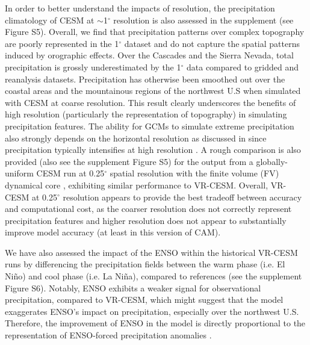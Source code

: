 \documentclass{ametsoc}
\begin{document}

 In order to better understand the impacts of resolution, the precipitation climatology of CESM at $\sim$1$^\circ$ resolution is also assessed in the supplement (see Figure S5). Overall, we find that precipitation patterns over complex topography are poorly represented in the 1$^\circ$ dataset and do not capture the spatial patterns induced by orographic effects. Over the Cascades and the Sierra Nevada, total precipitation is grossly underestimated by the 1$^\circ$ data compared to gridded and reanalysis datasets. Precipitation has otherwise been smoothed out over the coastal areas and the mountainous regions of the northwest U.S when simulated with CESM at coarse resolution.  This result clearly underscores the benefits of high resolution (particularly the representation of topography) in simulating precipitation features. The ability for GCMs to simulate extreme precipitation also strongly depends on the horizontal resolution as discussed in \cite{wehner2010effect} since precipitation typically intensifies at high resolution \citep{rauscher2016multimodel, o2016resolution}. A rough comparison is also provided (also see the supplement Figure S5) for the output from a globally-uniform CESM run at 0.25$^\circ$ spatial resolution with the finite volume (FV) dynamical core \citep{wehner2014effect}, exhibiting similar performance to VR-CESM. Overall, VR-CESM at 0.25$^\circ$ resolution appears to provide the best tradeoff between accuracy and computational cost, as the coarser resolution does not correctly represent precipitation features and higher resolution does not appear to substantially improve model accuracy (at least in this version of CAM).

We have also assessed the impact of the ENSO within the historical VR-CESM runs by differencing the precipitation fields between the warm phase (i.e. El Ni\~no) and cool phase (i.e. La Ni\~na), compared to references (see the supplement Figure S6). Notably, ENSO exhibits a weaker signal for observational precipitation, compared to VR-CESM, which might suggest that the model exaggerates ENSO's impact on precipitation, especially over the northwest U.S. Therefore, the improvement of ENSO in the model is directly proportional to the representation of ENSO-forced precipitation anomalies \citep{achutarao2006enso}.
\end{document}
